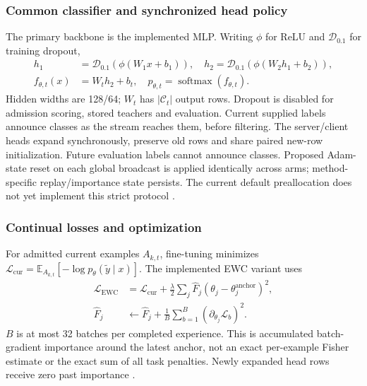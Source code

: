 \documentclass[10pt,a4paper]{article}
\begin{document}
\subsubsection{Common classifier and synchronized head policy}
The primary backbone is the implemented MLP. Writing $\phi$ for ReLU and $\mathcal D_{0.1}$ for training dropout,
\begin{equation}
\begin{aligned}
 h_1&=\mathcal D_{0.1}\!\left(\phi(W_1x+b_1)\right),\quad
 h_2=\mathcal D_{0.1}\!\left(\phi(W_2h_1+b_2)\right),\\
 f_{\theta,t}(x)&=W_th_2+b_t,\quad p_{\theta,t}=\operatorname{softmax}(f_{\theta,t}).
\end{aligned}
\end{equation}
Hidden widths are 128/64; $W_t$ has $|\mathcal C_t|$ output rows. Dropout is disabled for admission scoring, stored teachers and evaluation. Current supplied labels announce classes as the stream reaches them, before filtering. The server/client heads expand synchronously, preserve old rows and share paired new-row initialization. Future evaluation labels cannot announce classes. Proposed Adam-state reset on each global broadcast is applied identically across arms; method-specific replay/importance state persists. The current default preallocation does not yet implement this strict protocol \cite{repo,carillo}.

\subsubsection{Continual losses and optimization}
For admitted current examples $A_{k,t}$, fine-tuning minimizes $\mathcal L_{\mathrm{cur}}=\mathbb E_{A_{k,t}}[-\log p_\theta(\widetilde y\mid x)]$. The implemented EWC variant uses
\begin{equation}
\begin{aligned}
\mathcal L_{\mathrm{EWC}}&=\mathcal L_{\mathrm{cur}}+
\frac{\lambda}{2}\sum_j\widehat F_j(\theta_j-\theta_j^{\mathrm{anchor}})^2,
\\
\widehat F_j&\leftarrow \widehat F_j+
\frac{1}{B}\sum_{b=1}^{B}\left(\partial_{\theta_j}\mathcal L_b\right)^2.
\end{aligned}
\end{equation}
$B$ is at most 32 batches per completed experience. This is accumulated batch-gradient importance around the latest anchor, not an exact per-example Fisher estimate or the exact sum of all task penalties. Newly expanded head rows receive zero past importance \cite{repo}.
\end{document}
